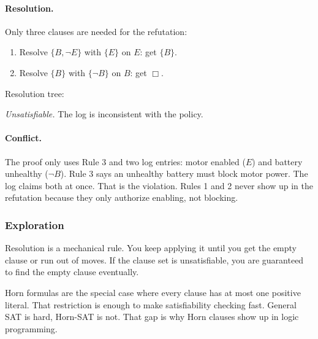 \documentclass{article}
\theoremstyle{theorem}
\theoremstyle{definition}
\theoremstyle{remark}
\begin{document}
\paragraph{Resolution.} Only three clauses are needed for the refutation:
\begin{enumerate}
  \item Resolve $\{B, \lnot E\}$ with $\{E\}$ on $E$: get $\{B\}$.
  \item Resolve $\{B\}$ with $\{\lnot B\}$ on $B$: get $\Box$.
\end{enumerate}

Resolution tree:

\begin{center}
\end{center}

\emph{Unsatisfiable.} The log is inconsistent with the policy.

\paragraph{Conflict.} The proof only uses Rule 3 and two log entries: motor enabled ($E$) and battery unhealthy ($\lnot B$). Rule 3 says an unhealthy battery must block motor power. The log claims both at once. That is the violation. Rules 1 and 2 never show up in the refutation because they only authorize enabling, not blocking.

\subsubsection{Exploration}

Resolution is a mechanical rule. You keep applying it until you get the empty clause or run out of moves. If the clause set is unsatisfiable, you are guaranteed to find the empty clause eventually.

Horn formulas are the special case where every clause has at most one positive literal. That restriction is enough to make satisfiability checking fast. General SAT is hard, Horn-SAT is not. That gap is why Horn clauses show up in logic programming.
\end{document}
